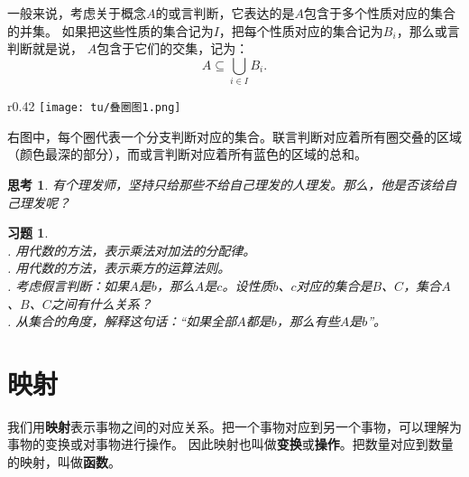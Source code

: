 \documentclass[12pt,UTF8]{ctexbook}
\theoremstyle{definition}
\theoremstyle{plain}
\newtheorem{sk}{思考}[section]
\newtheorem{xt}{习题}[section]
\begin{document}
一般来说，考虑关于概念$A$的或言判断，它表达的是$A$包含于多个性质对应的集合的并集。
如果把这些性质的集合记为$I$，把每个性质对应的集合记为$B_i$，那么或言判断就是说，
$A$包含于它们的交集，记为：
$$ A \subseteq \bigcup_{i\in I} B_i. $$

\begin{wrapfigure}{r}{0.42\textwidth} %
    \vspace{-28pt}
    \flushright
    \texttt{[image: tu/叠圈图1.png]}
\end{wrapfigure}

右图中，每个圈代表一个分支判断对应的集合。联言判断对应着所有圈交叠的区域（颜色最深的部分），而或言判断对应着所有蓝色的区域的总和。

\begin{sk}\label{sk:2-1-1}
     有个理发师，坚持只给那些不给自己理发的人理发。那么，他是否该给自己理发呢？
\end{sk}

\begin{xt}\label{xt:2-1-1}
    \mbox{} \\
    . 用代数的方法，表示乘法对加法的分配律。\\
    . 用代数的方法，表示乘方的运算法则。\\
    . 考虑假言判断：如果$A$是$b$，那么$A$是$c$。设性质$b$、$c$对应的集合是$B$、$C$，集合$A$、$B$、$C$之间有什么关系？\\
    . 从集合的角度，解释这句话：“如果全部$A$都是$b$，那么有些$A$是$b$”。
\end{xt}

\section{映射}
我们用\textbf{映射}表示事物之间的对应关系。把一个事物对应到另一个事物，可以理解为事物的变换或对事物进行操作。
因此映射也叫做\textbf{变换}或\textbf{操作}。把数量对应到数量的映射，叫做\textbf{函数}。
\end{document}
